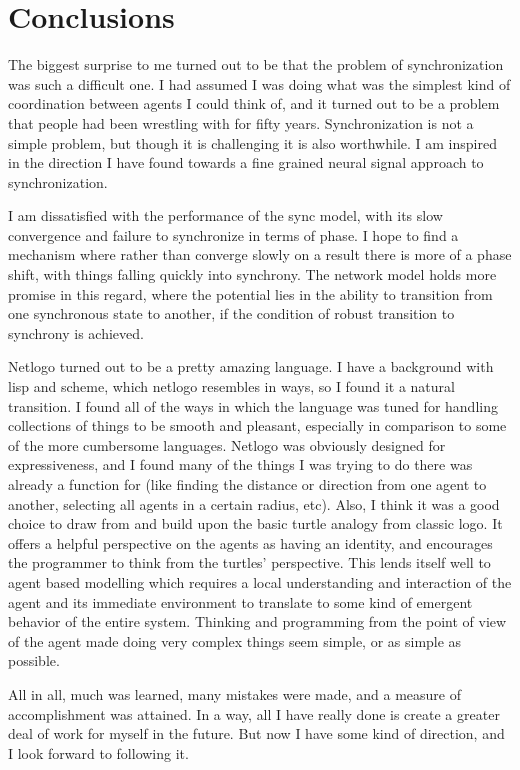 \documentclass[12pt]{article}
\begin{document}
\section{Conclusions}

The biggest surprise to me turned out to be that the problem of synchronization was such a difficult one.  I had assumed I was doing what was the simplest kind of coordination between agents I could think of, and it turned out to be a problem that people had been wrestling with for fifty years.  Synchronization is not a simple problem, but though it is challenging it is also worthwhile.  I am inspired in the direction I have found towards a fine grained neural signal approach to synchronization.  

I am dissatisfied with the performance of the sync model, with its slow convergence and failure to synchronize in terms of phase.  I hope to find a mechanism where rather than converge slowly on a result there is more of a phase shift, with things falling quickly into synchrony.  The network model holds more promise in this regard, where the potential lies in the ability to transition from one synchronous state to another, if the condition of robust transition to synchrony is achieved.  

Netlogo turned out to be a pretty amazing language.  I have a background with lisp and scheme, which netlogo resembles in ways, so I found it a natural transition.  I found all of the ways in which the language was tuned for handling collections of things to be smooth and pleasant, especially in comparison to some of the more cumbersome languages.  Netlogo was obviously designed for expressiveness, and I found many of the things I was trying to do there was already a function for (like finding the distance or direction from one agent to another, selecting all agents in a certain radius, etc).  Also, I think it was a good choice to draw from and build upon the basic turtle analogy from classic logo.  It offers a helpful perspective on the agents as having an identity, and encourages the programmer to think from the turtles' perspective.  This lends itself well to agent based modelling which requires a local understanding and interaction of the agent and its immediate environment to translate to some kind of emergent behavior of the entire system.  Thinking and programming from the point of view of the agent made doing very complex things seem simple, or as simple as possible.

All in all, much was learned, many mistakes were made, and a measure of accomplishment was attained.  In a way, all I have really done is create a greater deal of work for myself in the future.  But now I have some kind of direction, and I look forward to following it.  



\end{document}
